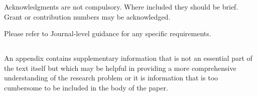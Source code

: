 \documentclass[sn-basic,pdflatex]{sn-jnl}
\theoremstyle{remark}
\theoremstyle{definition}
\begin{document}

Acknowledgments are not compulsory. Where included they should be brief.
Grant or contribution numbers may be acknowledged.

Please refer to Journal-level guidance for any specific requirements.

\begin{appendices}

\hypertarget{secA}{%
\section{}\label{secA}}

An appendix contains supplementary information that is not an essential
part of the text itself but which may be helpful in providing a more
comprehensive understanding of the research problem or it is information
that is too cumbersome to be included in the body of the paper.

\end{appendices}


\end{document}
